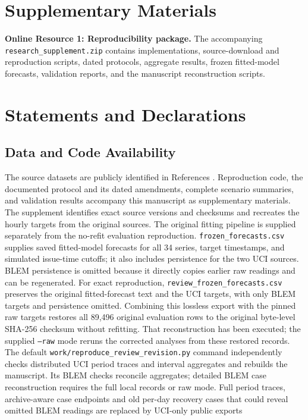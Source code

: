 \documentclass[12pt]{article}
\begin{document}
\FloatBarrier
\section*{Supplementary Materials}
\textbf{Online Resource 1: Reproducibility package.}
The accompanying \texttt{research\_supplement.zip} contains implementations,
source-download and reproduction scripts, dated protocols, aggregate
results, frozen fitted-model forecasts, validation reports, and the
manuscript reconstruction scripts.

\section*{Statements and Declarations}
\subsection*{Data and Code Availability}
The source datasets are publicly identified in References
\cite{uci,portugal,blem}. Reproduction code, the documented protocol and its
dated amendments, complete scenario summaries, and
validation results accompany this manuscript as supplementary materials.
The supplement identifies exact source versions and checksums and recreates
the hourly targets from the original sources. The original fitting pipeline
is supplied separately from the no-refit evaluation reproduction.
\texttt{frozen\_forecasts.csv} supplies saved fitted-model forecasts for all
34 series, target timestamps, and simulated issue-time cutoffs; it also
includes persistence for the two UCI sources. BLEM persistence is omitted
because it directly copies earlier raw readings and can be regenerated.
For exact reproduction, \texttt{review\_frozen\_forecasts.csv} preserves
the original fitted-forecast text and the UCI targets, with only BLEM
targets and persistence omitted. Combining this lossless export with the
pinned raw targets restores all 89,496 original evaluation rows to the
original byte-level SHA-256 checksum without refitting. That reconstruction
has been executed; the supplied \texttt{--raw} mode reruns the corrected
analyses from these restored records. The default
\texttt{work/reproduce\_review\_revision.py} command independently checks
distributed UCI period traces and interval aggregates and rebuilds the
manuscript. Its BLEM checks reconcile aggregates; detailed BLEM case
reconstruction requires the full local records or raw mode. Full period
traces, archive-aware case endpoints and old per-day recovery cases that
could reveal omitted BLEM readings are replaced by UCI-only public exports
\end{document}

